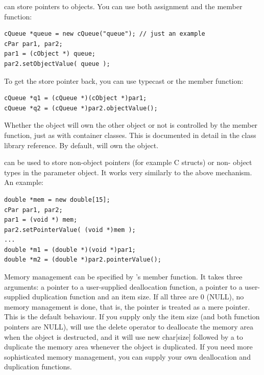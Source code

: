  can store pointers to {\opp} objects. You can use both
assignment and the  member function:

\begin{verbatim}
cQueue *queue = new cQueue("queue"); // just an example
cPar par1, par2;
par1 = (cObject *) queue;
par2.setObjectValue( queue );
\end{verbatim}

To get the store pointer back, you can use typecast or the 
member function:

\begin{verbatim}
cQueue *q1 = (cQueue *)(cObject *)par1;
cQueue *q2 = (cQueue *)par2.objectValue();
\end{verbatim}


Whether the  object will own the other object or not is
controlled by the  member
function, just as with container classes. This is documented in detail
in the class library reference.  By default,  will own
the object.

 can be used to store non-object
pointers (for example C structs) or
non-{\opp} object types in the parameter object.  It works very
similarly to the above mechanism. An example:

\begin{verbatim}
double *mem = new double[15];
cPar par1, par2;
par1 = (void *) mem;
par2.setPointerValue( (void *)mem );
...
double *m1 = (double *)(void *)par1;
double *m2 = (double *)par2.pointerValue();
\end{verbatim}


Memory management can be specified by
's  member function. It takes
three arguments: a pointer to a user-supplied deallocation
function, a pointer to a user-supplied duplication function and
an item size. If all three are 0 (NULL), no memory management is done,
that is, the pointer is treated as a mere pointer. This is the default
behaviour. If you supply only the item size (and both function
pointers are NULL),  will use the delete operator to
deallocate the memory area when the  object is
destructed, and it will use new char[size] followed by a
 to duplicate the memory area whenever the
 object is duplicated. If you need more sophisticated
memory management, you can supply your own deallocation and
duplication functions.

